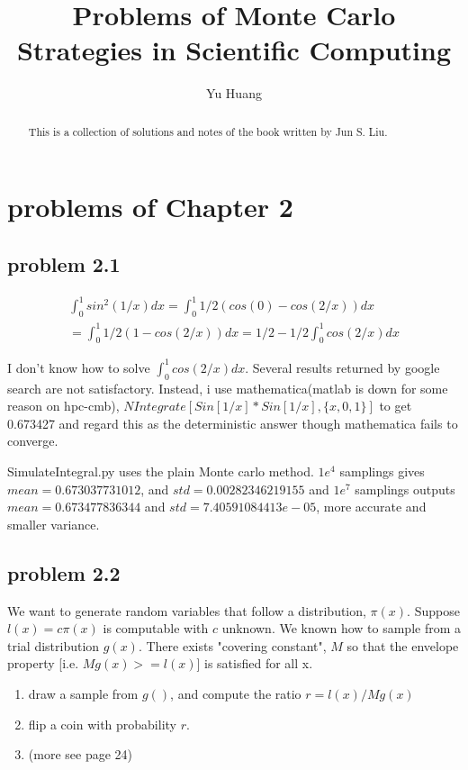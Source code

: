 \documentclass[a4paper,10pt]{article}
\title{Problems of Monte Carlo Strategies in Scientific Computing}
\author{Yu Huang}
\begin{document}
\maketitle

\begin{abstract}
This is a collection of solutions and notes of the book written by Jun S. Liu.
\end{abstract}
\tableofcontents

\section{problems of Chapter 2}
\subsection{problem 2.1}

\begin{eqnarray*}
\int_{0}^{1} sin^2(1/x)dx = \int_{0}^{1}1/2(cos(0)-cos(2/x))dx \\
=\int_{0}^{1}1/2(1-cos(2/x))dx = 1/2 - 1/2\int_{0}^{1}cos(2/x)dx
\end{eqnarray*}


I don't know how to solve $\int_{0}^{1}cos(2/x)dx$. Several results returned by google search are not satisfactory. Instead, i use mathematica(matlab is down for some reason on hpc-cmb), $NIntegrate[Sin[1/x]*Sin[1/x], \{x, 0, 1\}]$ to get 0.673427 and regard this as the deterministic answer though mathematica fails to converge.

SimulateIntegral.py uses the plain Monte carlo method. $1e^4$ samplings gives $mean=0.673037731012$, and $std=0.00282346219155$ and $1e^7$ samplings outputs $mean=0.673477836344$ and $std=7.40591084413e-05$, more accurate and smaller variance.

\subsection{problem 2.2}
We want to generate random variables that follow a distribution, $\pi(x)$. Suppose $l(x)=c\pi(x)$ is computable with $c$ unknown. We known how to sample from a trial distribution $g(x)$. There exists "covering constant", $M$ so that the envelope property [i.e. $Mg(x)>=l(x)$] is satisfied for all x.

\begin{enumerate}
\item draw a sample from $g()$, and compute the ratio $r=l(x)/Mg(x)$
\item flip a coin with probability $r$.
\item (more see page 24)
\end{enumerate}
\end{document}
